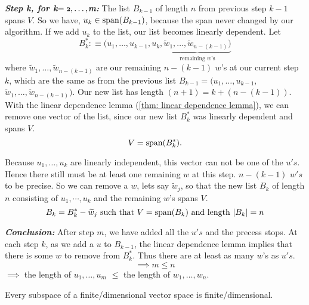 \begin{prf}
  \emph{\bfseries Step k, for k$=\mathbf{\mathsmaller{2}, \ldots,}$m:} The list $B_{k-1}$ of length $n$ from previous step $k-1$ spans $V$. So we have, $u_k \in \operatorname{span} (B_{k-1})$, because the span never changed by our algorithm. If we add $u_k$ to the list, our list becomes linearly dependent. Let
  \begin{equation*}
    B_k^* :\equiv (u_1, \ldots, u_{k-1}, u_k, \underbrace{\widetilde w_{1}, \ldots, \widetilde w_{n-(k-1)})}_{\text{remaining $w$'s}} 
  \end{equation*}
  where $\widetilde w_{1}, \ldots, \widetilde w_{n-(k-1)}$ are our remaining $n-(k-1)$ $w$'s at our current step $k$, which are the same as from the previous list $B_{k-1}$$=$$(u_1, \ldots,u_{k-1},$$ \widetilde w_{1}, \ldots, \widetilde w_{n-(k-1)})$. Our new list has length $(n+1) = k + (n-(k-1))$. With the linear dependence lemma (\ref{thm: linear dependence lemma}), we can remove one vector of the list, since our new list $B_{k}^*$ was linearly dependent and spans $V$. 
  \begin{equation*}
    V=\operatorname{span} (B_{k}^*). 
  \end{equation*}
  
  Because $u_1, \ldots, u_k$ are linearly independent, this vector can not be one of the $u's$. Hence there still must be at least one remaining $w$ at this step. $n-(k-1)$ $w's$ to be precise. So we can remove a $w$, lets say $\widetilde w_j$, so that the new list $B_k$ of length $n$ consisting of $u_1, \cdots, u_k$ and the remaining $w$'s spans $V$. 
  \begin{equation*}
    B_k = B_k^* - \widetilde w_j$ such that $ V=\myspan{B_k}$ and length $|B_k|=n
  \end{equation*}
  
  \emph{\bfseries Conclusion:} After step $m$, we have added all the $u's$ and the precess stops. At each step $k$, as we add a $u$ to $B_{k-1}$, the linear dependence lemma implies that there is some $w$ to remove from $B_{k}^*$. Thus there are at least as many $w$'s as $u's$.
  \begin{equation*}
    \implies m \leq n
  \end{equation*}
  $\implies$ the length of $u_1, \ldots, u_m$ $\leq$ the length of $w_1, \ldots, w_n$.
\end{prf}

\setcounter{thm}{24}
\begin{thm} 
  \label{thm: finite-dimensional subspace}
  Every subspace of a finite\-/dimensional vector space is finite\-/dimensional.
\end{thm}
